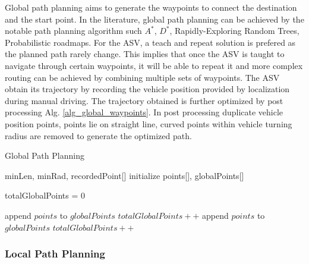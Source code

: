 \documentclass[10 pt,a4paper,conference]{IEEEtran}
\begin{document}
Global path planning aims to generate the waypoints to connect the
destination and the start point. In the literature, global path planning
can be achieved by the notable path planning algorithm such
\(A^{*}\)\citep{hart1968formal}, \(D^{*}\)\citep{stentz1994optimal},
Rapidly-Exploring Random Trees\citep{lavalle1998rapidly}, Probabilistic
roadmaps\citep{kavraki1996probabilistic}. For the ASV, a teach and
repeat solution is prefered as the planned path rarely change. This
implies that once the ASV is taught to navigate through certain
waypoints, it will be able to repeat it and more complex routing can be
achieved by combining multiple sets of waypoints. The ASV obtain its
trajectory by recording the vehicle position provided by localization
during manual driving. The trajectory obtained is further optimized by
post processing Alg. \ref{alg_global_waypoints}. In post processing
duplicate vehicle position points, points lie on straight line, curved
points within vehicle turning radius are removed to generate the
optimized path.

\begin{algorithm}
      \scriptsize
      \caption{Global Path Planning}
      \label{alg_global_waypoints}
      \begin{algorithmic}[1]
          \REQUIRE minLen, minRad, recordedPoint[] 
            \STATE initialize points[], globalPoints[] 

            \STATE totalGlobalPoints = 0
            
                    \STATE append $points$ to $globalPoints$
                    \STATE $totalGlobalPoints++$
                \ELSE
                        \STATE append $points$ to $globalPoints$
                        \STATE $totalGlobalPoints++$
                    \ENDIF
                \ENDIF
            \ENDFOR
      \end{algorithmic}
\end{algorithm}

\subsubsection{Local Path Planning}\label{local-path-planning}
\end{document}
